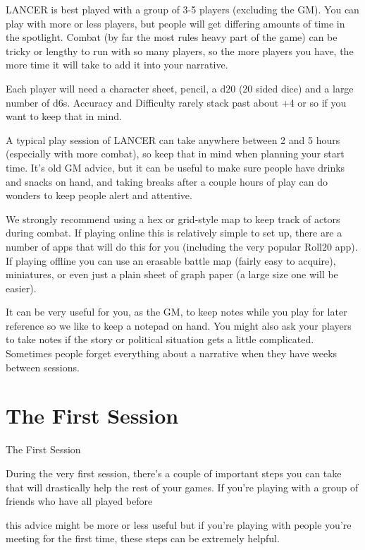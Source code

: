 LANCER is best played with a group of 3-5 players (excluding the GM). You can play with more  
or less players, but people will get differing amounts of time in the spotlight. Combat (by far the  
most rules heavy part of the game) can be tricky or lengthy to run with so many players, so the  
more players you have, the more time it will take to add it into your narrative. 
 

Each player will need a character sheet, pencil, a d20 (20 sided dice) and a large number of  
d6s. Accuracy and Difficulty rarely stack past about +4 or so if you want to keep that in mind. 
 

A typical play session of LANCER can take anywhere between 2 and 5 hours (especially with  
more combat), so keep that in mind when planning your start time. It’s old GM advice, but it can  
be useful to make sure people have drinks and snacks on hand, and taking breaks after a couple  
hours of play can do wonders to keep people alert and attentive.
 

We strongly recommend using a hex or grid-style map to keep track of actors during  
combat. If playing online this is relatively simple to set up, there are a number of apps that will  
do this for you (including the very popular Roll20 app). If playing offline you can use an erasable  
battle map (fairly easy to acquire), miniatures, or even just a plain sheet of graph paper (a large  
size one will be easier). 
 

It can be very useful for you, as the GM, to keep notes while you play for later reference so we  
like to keep a notepad on hand. You might also ask your players to take notes if the story or  
political situation gets a little complicated. Sometimes people forget everything about a narrative  
when they have weeks between sessions.
 
\section{The First Session}
                                                The First Session  

During the very first session, there’s a couple of important steps you can take that will drastically  
help the rest of your games. If you’re playing with a group of friends who have all played before  

                                                                                                                


this advice might be more or less useful but if you’re playing with people you’re meeting for the  
first time, these steps can be extremely helpful.
 

